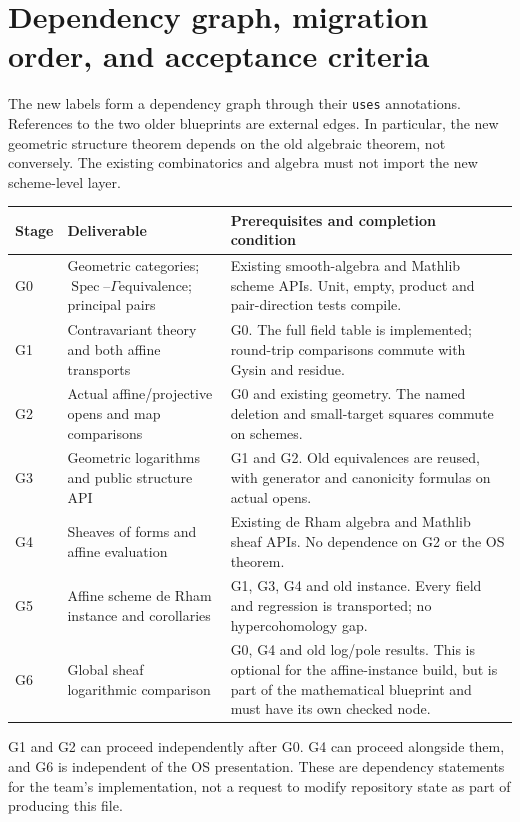 \documentclass[11pt]{article}
\newcommand{\Spec}{\operatorname{Spec}}
\newcommand{\planned}[1]{\texttt{\detokenize{#1}}}
\theoremstyle{definition}
\theoremstyle{remark}
\newcommand{\old}[1]{\texttt{\detokenize{#1}}}
\newcommand{\G}{\ensuremath{\Gamma}}
\renewcommand{\Spec}{\ensuremath{\operatorname{Spec}}}
\renewcommand{\planned}[1]{\nolinkurl{#1}}
\begin{document}
\section{Dependency graph, migration order, and acceptance criteria}

The new \old{geo-} labels form a dependency graph through their \planned{uses} annotations. References to the two older blueprints are external edges. In particular, the new geometric structure theorem depends on the old algebraic theorem, not conversely. The existing combinatorics and algebra must not import the new scheme-level layer.

\begin{center}
\begin{tabular}{p{}p{}p{}}
\toprule Stage & Deliverable & Prerequisites and completion condition\\\midrule
G0 & Geometric categories; \Spec--\G equivalence; principal pairs & Existing smooth-algebra and Mathlib scheme APIs. Unit, empty, product and pair-direction tests compile.\\
G1 & Contravariant theory and both affine transports & G0. The full field table is implemented; round-trip comparisons commute with Gysin and residue.\\
G2 & Actual affine/projective opens and map comparisons & G0 and existing geometry. The named deletion and small-target squares commute on schemes.\\
G3 & Geometric logarithms and public structure API & G1 and G2. Old equivalences are reused, with generator and canonicity formulas on actual opens.\\
G4 & Sheaves of forms and affine evaluation & Existing de Rham algebra and Mathlib sheaf APIs. No dependence on G2 or the OS theorem.\\
G5 & Affine scheme de Rham instance and corollaries & G1, G3, G4 and old instance. Every field and regression is transported; no hypercohomology gap.\\
G6 & Global sheaf logarithmic comparison & G0, G4 and old log/pole results. This is optional for the affine-instance build, but is part of the mathematical blueprint and must have its own checked node.\\
\bottomrule
\end{tabular}
\end{center}

G1 and G2 can proceed independently after G0. G4 can proceed alongside them, and G6 is independent of the OS presentation. These are dependency statements for the team's implementation, not a request to modify repository state as part of producing this file.
\end{document}
